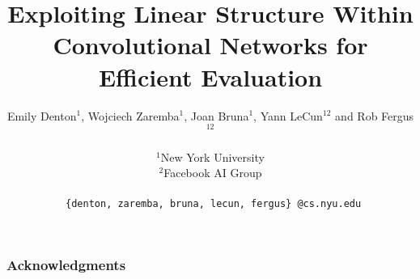 \documentclass{article} %
\title{Exploiting Linear Structure Within Convolutional Networks
  for Efficient Evaluation}
\author{
Emily Denton$^1$, Wojciech Zaremba$^1$, Joan Bruna$^1$, Yann LeCun$^{12}$ and Rob Fergus$^{12}$\\\\
$^1$New York University\\
$^2$Facebook AI Group\\\\
\texttt{ \{denton, zaremba, bruna, lecun, fergus\} @cs.nyu.edu} \\
}
\begin{document}
\maketitle







\subsubsection*{Acknowledgments}

\nocite{*}


\end{document}
